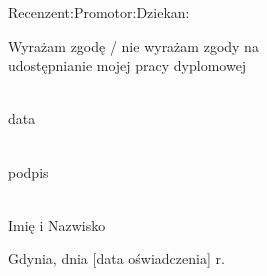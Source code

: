 \documentclass[a4paper,12pt,twoside]{book}
\begin{document}
    \vspace{1.5cm}
    \noindent
    Recenzent:\dotfill Promotor:\dotfill Dziekan:\dotfill

    \vfill
    \begin{flushright}
        \begin{minipage}{.5\linewidth}
            \begin{flushright}
                Wyrażam zgodę / nie wyrażam zgody na\\
                udostępnianie mojej pracy dyplomowej
                
                \vspace{1cm}
                \begin{minipage}{.47\linewidth}
                    \begin{center}
                        \dotfill \\
                        data
                    \end{center}
                \end{minipage}
                \begin{minipage}{.47\linewidth}
                    \begin{center}
                        \vspace{0.1cm}
                        \dotfill \\
                        podpis
                    \end{center}
                \end{minipage}
            \end{flushright}
        \end{minipage}
    \end{flushright}
    
    \newpage
    
    \thispagestyle{empty}
    
    \noindent
    \begin{minipage}{0.5\linewidth}
        \begin{flushleft}
            \begin{minipage}{.8\linewidth}
                \begin{center}
                    \dotfill \\
                    Imię i Nazwisko
                \end{center}
            \end{minipage}
        \end{flushleft}
    \end{minipage}
    \begin{minipage}{0.5\linewidth}
        \begin{flushright}
                Gdynia, dnia [data oświadczenia] r.\\
                \hfill
        \end{flushright}
    \end{minipage}
    
\end{document}
